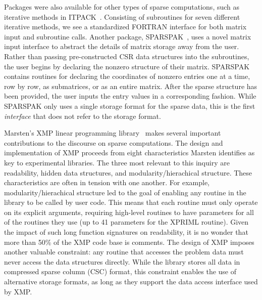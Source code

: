 Packages were also available for other types of sparse computations, such as iterative methods in ITPACK~\cite{kincaid1982algorithm}.
Consisting of subroutines for seven different iterative methods, we see a standardized FORTRAN interface for both matrix input and subroutine calls. 
Another package, SPARSPAK~\cite{chu1980user,george1984new}, uses a novel matrix input interface to abstract the details of matrix storage away from the user.
Rather than passing pre-constructed CSR data structures into the subroutines, the user begins by declaring the nonzero structure of their matrix. 
SPARSPAK contains routines for declaring the coordinates of nonzero entries one at a time, row by row, as submatrices, or as an entire matrix.
After the sparse structure has been provided, the user inputs the entry values in a corresponding fashion. 
While SPARSPAK only uses a single storage format for the sparse data, this is the first \textit{interface} that does not refer to the storage format.

Marsten's XMP linear programming library~\cite{marsten1981design} makes several important contributions to the discourse on sparse computations.
The design and implementation of XMP proceeds from eight characteristics Marsten identifies as key to experimental libraries. 
The three most relevant to this inquiry are readability, hidden data structures, and modularity/hierachical structure. 
These characteristics are often in tension with one another. 
For example, modularity/hierachical structure led to the goal of enabling any routine in the library to be called by user code.
This means that each routine must only operate on its explicit arguments, requiring high-level routines to have parameters for all of the routines they use (up to 41 parameters for the XPRIML routine).
Given the impact of such long function signatures on readability, it is no wonder that more than 50\% of the XMP code base is comments.
The design of XMP imposes another valuable constraint: any routine that accesses the problem data must never access the data structures directly. 
While the library stores all data in compressed sparse column (CSC) format, this constraint enables the use of alternative storage formats, as long as they support the data access interface used by XMP.




\cite{dongarraxz1994sparse}





